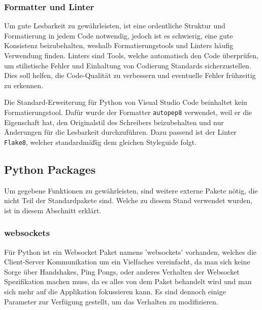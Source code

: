 \subsubsection{Formatter und Linter} 
Um gute Lesbarkeit zu gewährleisten, 
ist eine ordentliche Struktur und Formatierung in jedem Code notwendig, 
jedoch ist es schwierig, eine gute Konsistenz beizubehalten, 
weshalb Formatierungstools und Linters häufig Verwendung finden. 
% 
Linters sind Tools, welche automatisch den Code überprüfen, 
um stilistische Fehler und Einhaltung von Codierung Standards sicherzustellen.
Dies soll helfen, die Code-Qualität zu verbessern 
und eventuelle Fehler frühzeitig zu erkennen.

Die Standard-Erweiterung für Python von Visual Studio Code 
beinhaltet kein Formatierungstool.
Dafür wurde der Formatter \texttt{autopep8} verwendet, 
weil er die Eigenschaft hat, den Originalstil des Schreibers beizubehalten
und nur Änderungen für die Lesbarkeit durchzuführen. 
Dazu passend ist der Linter \texttt{Flake8}, welcher standardmäßig 
dem gleichen Styleguide  folgt.


\subsection{Python Packages}
Um gegebene Funktionen zu gewährleisten, sind weitere externe Pakete nötig, 
die nicht Teil der Standardpakete sind.
Welche zu diesem Stand verwendet wurden, ist in diesem Abschnitt erklärt.

\subsubsection{websockets}
Für Python ist ein Websocket Paket namens 'websockets' vorhanden, 
welches die Client-Server Kommunikation um ein Vielfaches vereinfacht, 
da man sich keine Sorge über Handshakes, Ping Pongs, 
oder anderes Verhalten der Websocket Spezifikation machen muss, 
da es alles von dem Paket behandelt wird 
und man sich mehr auf die Applikation fokussieren kann. 
Es sind dennoch einige Parameter zur Verfügung gestellt, 
um das Verhalten zu modifizieren.

